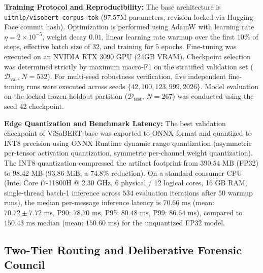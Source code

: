 \documentclass[journal]{IEEEtran}
\begin{document}
\textbf{Training Protocol and Reproducibility:} The base architecture is \texttt{uitnlp/visobert-corpus-tok} ($97.57\text{M}$ parameters, revision locked via Hugging Face commit hash). Optimization is performed using AdamW with learning rate $\eta = 2 \times 10^{-5}$, weight decay $0.01$, linear learning rate warmup over the first $10\%$ of steps, effective batch size of $32$, and training for $5$ epochs. Fine-tuning was executed on an NVIDIA RTX 3090 GPU (24GB VRAM). Checkpoint selection was determined strictly by maximum macro-F1 on the stratified validation set ($\mathcal{D}_{\text{val}}$, $N=532$). For multi-seed robustness verification, five independent fine-tuning runs were executed across seeds $\{42, 100, 123, 999, 2026\}$. Model evaluation on the locked frozen holdout partition ($\mathcal{D}_{\text{test}}$, $N=267$) was conducted using the seed 42 checkpoint.

\textbf{Edge Quantization and Benchmark Latency:} The best validation checkpoint of ViSoBERT-base was exported to ONNX format and quantized to INT8 precision using ONNX Runtime dynamic range quantization (asymmetric per-tensor activation quantization, symmetric per-channel weight quantization). The INT8 quantization compressed the artifact footprint from $390.54\text{ MB}$ (FP32) to $98.42\text{ MB}$ ($93.86\text{ MiB}$, a $74.8\%$ reduction). On a standard consumer CPU (Intel Core i7-11800H @ 2.30 GHz, 6 physical / 12 logical cores, 16 GB RAM, single-thread batch-1 inference across $534$ evaluation iterations after $50$ warmup runs), the median per-message inference latency is $70.66\text{ ms}$ (mean: $70.72 \pm 7.72\text{ ms}$, P90: $78.70\text{ ms}$, P95: $80.48\text{ ms}$, P99: $86.64\text{ ms}$), compared to $150.43\text{ ms}$ median (mean: $150.60\text{ ms}$) for the unquantized FP32 model.

\subsection{Two-Tier Routing and Deliberative Forensic Council}
\label{subsec:routing_council}
\end{document}
